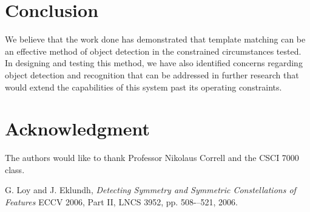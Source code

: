 \documentclass[conference]{IEEEtran}
\begin{document}
\section{Conclusion}
We believe that the work done has demonstrated that template matching can be an effective method of object detection in the constrained circumstances tested.  In designing and testing this method, we have also identified concerns regarding object detection and recognition that can be addressed in further research that would extend the capabilities of this system past its operating constraints.



\section*{Acknowledgment}

The authors would like to thank Professor Nikolaus Correll and the CSCI 7000 class.





%
%
%
\begin{thebibliography}{1}


G. Loy and J. Eklundh, \emph{Detecting Symmetry and Symmetric Constellations of Features}
\relax ECCV 2006, Part II, LNCS 3952, pp. 508-–521, 2006.

\end{thebibliography}




\end{document}

